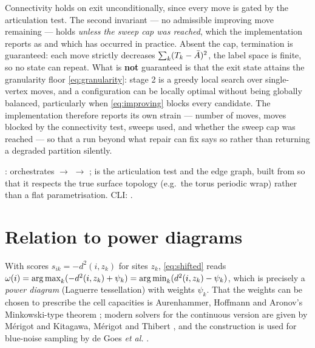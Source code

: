 \documentclass[11pt,a4paper]{article}
\begin{document}
\begin{remark}
Connectivity holds on exit unconditionally, since every move is gated by the
articulation test. The second invariant --- no admissible improving move remaining
--- holds \emph{unless the sweep cap was reached}, which the implementation
reports as  and which has occurred in practice. Absent the
cap, termination is guaranteed: each move strictly decreases
$\sum_k (T_k - \bar{A})^2$, the label space is finite, so no state can repeat. What
is \textbf{not}
guaranteed is that the exit state attains the granularity floor
\eqref{eq:granularity}: stage 2 is a greedy local search over single-vertex moves,
and a configuration can be locally optimal without being globally balanced,
particularly when \eqref{eq:improving} blocks every candidate. The implementation
therefore reports its own strain --- number of moves, moves blocked by the
connectivity test, sweeps used, and whether the sweep cap was reached --- so that
a run beyond what repair can fix says so rather than returning a degraded
partition silently.
\end{remark}

\begin{tcolorbox}[colback=blue!4!white, colframe=blue!40!black,
                  title={Code: the two-stage readout}, fontupper=\small]
:
 orchestrates
 $\to$  $\to$
;  is the articulation test
and  the edge graph, built from  so
that it respects the true surface topology (e.g.\ the torus periodic wrap) rather
than a flat parametrisation. CLI: .
\end{tcolorbox}

\section{Relation to power diagrams}

With scores $s_{ik} = -d^2(i, z_k)$ for sites $z_k$, \eqref{eq:shifted} reads
$\omega(i) = \operatorname*{arg\,max}_k ( -d^2(i,z_k) + \psi_k ) = \operatorname*{arg\,min}_k ( d^2(i,z_k) - \psi_k )$,
which is precisely a \emph{power diagram} (Laguerre tessellation) with weights
$\psi_k$. That the weights can be chosen to prescribe the cell capacities is
Aurenhammer, Hoffmann and Aronov's Minkowski-type theorem
\cite{aurenhammer1998minkowski}; modern solvers for the continuous version are
given by Mérigot \cite{merigot2011multiscale} and Kitagawa, Mérigot and Thibert
\cite{kitagawa2019convergence}, and the construction is used for blue-noise
sampling by de Goes \emph{et al.} \cite{degoes2012bluenoise}.
\end{document}
